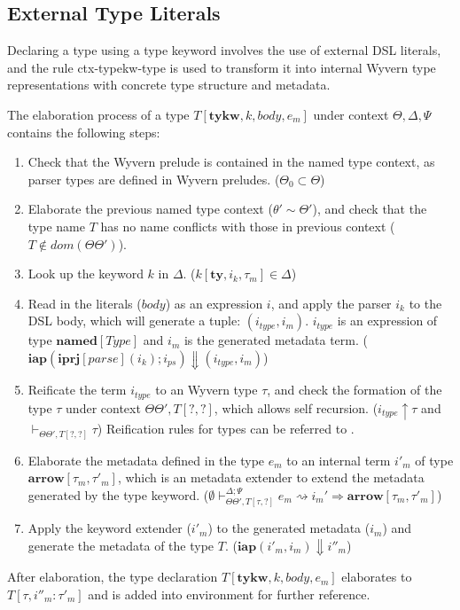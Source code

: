 \documentclass{sig-alternate}
\begin{document}
\subsection{External Type Literals}
Declaring a type using a type keyword involves the use of external DSL literals, and the rule ctx-typekw-type is used to transform it into internal Wyvern type representations with concrete type structure and metadata.

The elaboration process of a type $T[\mathbf{tykw},k,body,e_m]$ under context $\Theta,\Delta,\Psi$ contains the following steps:
\begin{enumerate}\setlength{\itemsep}{0pt}
\item Check that the Wyvern prelude is contained in the named type context, as parser types are defined in Wyvern preludes. ($\Theta_0\subset \Theta$)
\item Elaborate the previous named type context ($\theta'\sim\Theta'$), and check that the type name $T$ has no name conflicts with those in previous context ($T\notin dom(\Theta\Theta')$).
\item Look up the keyword $k$ in $\Delta$. ($k[\mathbf{ty},i_k,\tau_m]\in\Delta$)
\item Read in the literals ($body$) as an expression $i$, and apply the parser $i_k$ to the DSL body, which will generate a tuple: $(i_{type}, i_m)$. $i_{type}$ is an expression of type $\mathbf{named}[Type]$ and $i_m$ is the generated metadata term. ($\mathbf{iap}(\mathbf{iprj}[parse](i_k);i_{ps})\Downarrow(i_{type},i_{m})$)
\item Reificate the term $i_{type}$ to an Wyvern type $\tau$, and check the formation of the type $\tau$ under context $\Theta\Theta',T[?,?]$, which allows self recursion. ($i_{type}\uparrow\tau$ and $\vdash_{\Theta\Theta',T[?,?]}\tau$) Reification rules for types can be referred to .
\item Elaborate the metadata defined in the type $e_m$ to an internal term $i'_m$ of type $\mathbf{arrow}[\tau_m,\tau'_m]$, which is an metadata extender to extend the metadata generated by the type keyword. ($\emptyset\vdash_{\Theta\Theta',T[\tau,?]}^{\Delta;\Psi}e_m\rightsquigarrow i_m' \Rightarrow \mathbf{arrow}[\tau_m, \tau'_m]$)
\item Apply the keyword extender ($i'_m$) to the generated metadata ($i_m$) and generate the metadata of the type $T$. ($\mathbf{iap}(i'_m,i_m)\Downarrow i''_m$)  
\end{enumerate}
After elaboration, the type declaration $T[\mathbf{tykw},k,body,e_m]$ elaborates to $T[\tau,i''_m:\tau'_m]$ and is added into environment for further reference.
\end{document}
